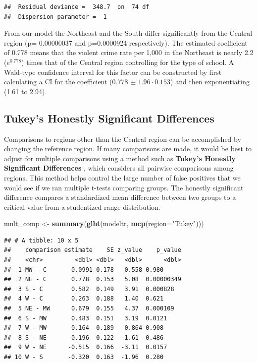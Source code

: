 \documentclass[
]{krantz}
\newenvironment{Shaded}{\begin{snugshade}}{\end{snugshade}}
\newcommand{\DataTypeTok}[1]{\textcolor[rgb]{0.27,0.27,0.27}{#1}}
\newcommand{\KeywordTok}[1]{\textcolor[rgb]{0.27,0.27,0.27}{\textbf{#1}}}
\newcommand{\NormalTok}[1]{#1}
\newcommand{\StringTok}[1]{\textcolor[rgb]{0.5,0.5,0.5}{#1}}
\begin{document}
\begin{verbatim}
##  Residual deviance =  348.7  on  74 df 
##  Dispersion parameter =  1
\end{verbatim}

From our model the Northeast and the South differ significantly from the Central region (p= 0.00000037 and p=0.0000924 respectively). The estimated coefficient of 0.778 means that the violent crime rate per 1,000 in the Northeast is nearly 2.2 (\(e^{0.778}\)) times that of the Central region controlling for the type of school. A Wald-type confidence interval for this factor can be constructed by first calculating a CI for the coefficient (0.778 \(\pm\) \(1.96 \cdot 0.153\)) and then exponentiating (1.61 to 2.94).

\hypertarget{tukeys-honestly-significant-differences}{%
\subsection{Tukey's Honestly Significant Differences}\label{tukeys-honestly-significant-differences}}

Comparisons to regions other than the Central region can be accomplished by changing the reference region. If many comparisons are made, it would be best to adjust for multiple comparisons using a method such as \textbf{Tukey's Honestly Significant Differences} , which considers all pairwise comparisons among regions. This method helps control the large number of false positives that we would see if we ran multiple t-tests comparing groups. The honestly significant difference compares a standardized mean difference between two groups to a critical value from a studentized range distribution.

\begin{Shaded}
\begin{Highlighting}[]
\NormalTok{mult_comp <-}\StringTok{ }\KeywordTok{summary}\NormalTok{(}\KeywordTok{glht}\NormalTok{(modeltr, }\KeywordTok{mcp}\NormalTok{(}\DataTypeTok{region=}\StringTok{"Tukey"}\NormalTok{)))}
\end{Highlighting}
\end{Shaded}

\begin{verbatim}
## # A tibble: 10 x 5
##    comparison estimate    SE z_value    p_value
##    <chr>         <dbl> <dbl>   <dbl>      <dbl>
##  1 MW - C       0.0991 0.178   0.558 0.980     
##  2 NE - C       0.778  0.153   5.08  0.00000349
##  3 S - C        0.582  0.149   3.91  0.000828  
##  4 W - C        0.263  0.188   1.40  0.621     
##  5 NE - MW      0.679  0.155   4.37  0.000109  
##  6 S - MW       0.483  0.151   3.19  0.0121    
##  7 W - MW       0.164  0.189   0.864 0.908     
##  8 S - NE      -0.196  0.122  -1.61  0.486     
##  9 W - NE      -0.515  0.166  -3.11  0.0157    
## 10 W - S       -0.320  0.163  -1.96  0.280
\end{verbatim}
\end{document}
